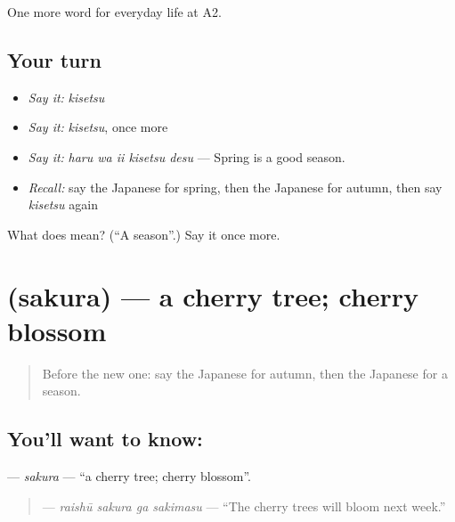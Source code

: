\begin{grammarlens}[title={What you've built}]
One more word for everyday life at A2.
\end{grammarlens}

\subsection*{Your turn}
\begin{itemize}
\raggedright
  \item \emph{Say it:} \emph{kisetsu}
  \item \emph{Say it:} \emph{kisetsu}, once more
  \item \emph{Say it:} \emph{haru wa ii kisetsu desu} — Spring is a good season.
  \item \emph{Recall:} say the Japanese for spring, then the Japanese for autumn, then say \emph{kisetsu} again
\end{itemize}

\begin{tcolorbox}[breakable,colback=teal!4,colframe=teal!35!black,title={Before you move on}]
What does  mean? (\textquotedblleft{}A season\textquotedblright{}.) Say it once more.
\end{tcolorbox}
\section[\texorpdfstring{\ja{さくら} (sakura)}{さくら (sakura)}]{ (sakura) — a cherry tree; cherry blossom}

\label{lesson:JA-C209-sakura}



\begin{quote}
Before the new one: say the Japanese for autumn, then the Japanese for a season.
\end{quote}

\subsection*{You'll want to know: }
\textbf{} — \emph{sakura} — \textquotedblleft{}a cherry tree; cherry blossom\textquotedblright{}.

\begin{quote}
\textbf{  } — \emph{raishū sakura ga sakimasu} — \textquotedblleft{}The cherry trees will bloom next week.\textquotedblright{}
\end{quote}

